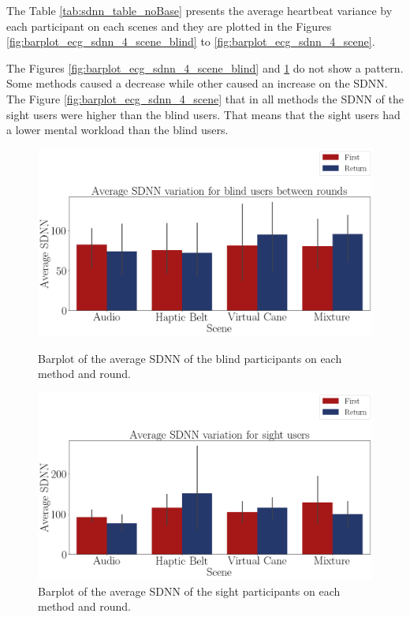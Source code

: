The Table \ref{tab:sdnn_table_noBase} presents the average heartbeat variance by each participant on each scenes and they are plotted in the Figures \ref{fig:barplot_ecg_sdnn_4_scene_blind} to \ref{fig:barplot_ecg_sdnn_4_scene}.



The Figures \ref{fig:barplot_ecg_sdnn_4_scene_blind} and \ref{fig:barplot_ecg_sdnn_4_scene_sight} do not show a pattern. Some methods caused a decrease while other caused an increase on the SDNN. The Figure \ref{fig:barplot_ecg_sdnn_4_scene} that in all methods the SDNN of the sight users were higher than the blind users. That means that the sight users had a lower mental workload than the blind users.

\begin{figure}[!htb]
    \centering
    \begin{minipage}{\textwidth}
        \centering
        \includegraphics[width = 0.8\linewidth]{Resultados/ECG/Figuras/png/barplot_ecg_sdnn_4_scene_blind.png}
        \caption{Barplot of the average SDNN of the blind participants on each method and round.}
        \label{fig:barplot_ecg_sdnn_4_scene_blind}
    \end{minipage}
    \begin{minipage}{\textwidth}
        \centering
        \includegraphics[width = 0.8\linewidth]{Resultados/ECG/Figuras/png/barplot_ecg_sdnn_4_scene_sight.png}
        \caption{Barplot of the average SDNN of the sight participants on each method and round.}
        \label{fig:barplot_ecg_sdnn_4_scene_sight}
    \end{minipage}
\end{figure}

